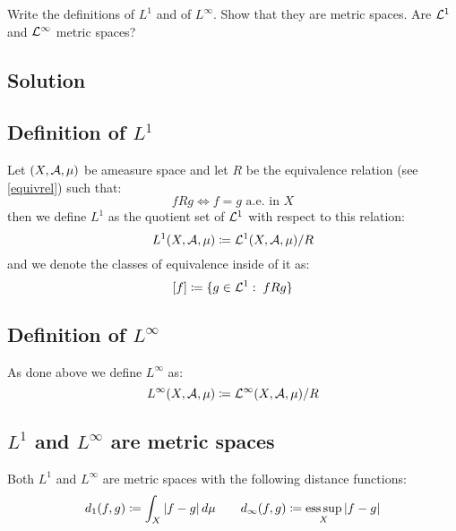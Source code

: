 
\question
Write the definitions of $L^1$ and of $L^\infty$. Show that they are metric spaces. Are $\mathcal{L}^1$ and $\mathcal{L}^\infty$ metric spaces?

\subsection*{Solution}

\subsection{Definition of \texorpdfstring{$L^1$}{L1}}
Let $(X,\mathcal{A},\mu)$ be ameasure space and let $R$ be the equivalence relation (see \ref{equivrel}) such that:
\[
    fRg \iff f=g \text{ a.e. in } X
\]
then we define $L^1$ as the quotient set of $\mathcal{L}^1$ with respect to this relation:
\[
    L^1 (X,\mathcal{A},\mu) \coloneqq \mathcal{L}^1(X,\mathcal{A},\mu) / R    
\]
and we denote the classes of equivalence inside of it as:
\[
    [f] \coloneqq \{ g\in\mathcal{L}^1 : \; fRg\}    
\]

\subsection{Definition of \texorpdfstring{$L^\infty$}{Linf}}
As done above we define $L^\infty$ as:
\[
    L^\infty(X,\mathcal{A},\mu) \coloneqq \mathcal{L}^\infty(X,\mathcal{A},\mu)/R    
\]

\subsection{\texorpdfstring{$L^1$}{L1} and \texorpdfstring{$L^\infty$}{Linf} are metric spaces}
Both $L^1$ and $L^\infty$ are metric spaces with the following distance functions:
\[
    d_1(f,g) \coloneqq \int_X |f-g| \, d\mu \quad \quad d_\infty(f,g) \coloneqq \operatorname*{ess\,sup}_X |f-g| 
\]

